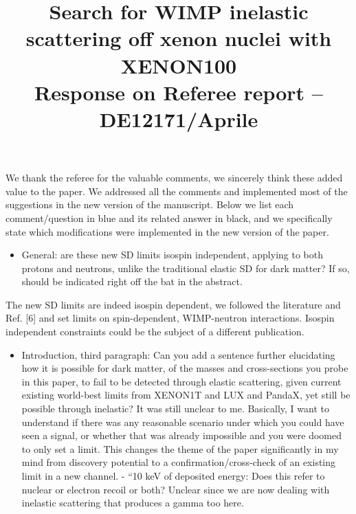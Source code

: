 \documentclass{article}
\begin{document}
\title{ \textbf{ Search for WIMP inelastic scattering off xenon nuclei with XENON100} \\  Response on Referee report -- DE12171/Aprile  }

\maketitle



We thank the referee for the valuable comments, we sincerely think these added value to the paper.  We addressed all the comments and implemented most of the suggestions in the new version of the manuscript. Below we list each comment/question in blue and its related answer in black, and we specifically state which modifications
were implemented in the new version of the paper.

\begin{itemize}
	\item {\color{blue} General: are these new SD limits isospin independent, applying to both protons and neutrons, unlike the traditional elastic SD for dark matter? If so, should be indicated right off the bat in the abstract.}
\end{itemize}

The new SD limits are indeed isospin dependent, we followed the literature and Ref. [6] and set limits on spin-dependent, WIMP-neutron interactions. Isospin independent constraints could be the subject of a different publication.

\begin{itemize}
	\item {\color{blue} Introduction, third paragraph: Can you add a sentence further
elucidating how it is possible for dark matter, of the masses and
cross-sections you probe in this paper, to fail to be detected through
elastic scattering, given current existing world-best limits from
XENON1T and LUX and PandaX, yet still be possible through inelastic?
It was still unclear to me. Basically, I want to understand if there
was any reasonable scenario under which you could have seen a signal, or
whether that was already impossible and you were doomed to only set
a limit. This changes the theme of the paper significantly in my mind
from discovery potential to a confirmation/cross-check of an existing
limit in a new channel. - “10 keV of deposited energy: Does this
refer to nuclear or electron recoil or both? Unclear since we are now
dealing with inelastic scattering that produces a gamma too here.}
\end{itemize}
\end{document}
